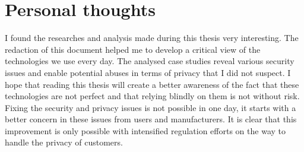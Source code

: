 \section{Personal thoughts}

I found the researches and analysis made during this thesis very interesting.
The redaction of this document helped me to develop a critical view of the technologies we use every day.
The analysed case studies reveal various security issues and enable potential abuses in terms of privacy that I did not suspect.
I hope that reading this thesis will create a better awareness of the fact that these technologies are not perfect and that relying blindly on them is not without risk.
Fixing the security and privacy issues is not possible in one day, it starts with a better concern in these issues from users and manufacturers.
It is clear that this improvement is only possible with intensified regulation efforts on the way to handle the privacy of customers.